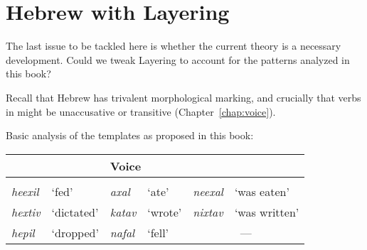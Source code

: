 

\section{Hebrew with Layering} \label{aas:hebrew}
The last issue to be tackled here is whether the current theory is a necessary development. Could we tweak Layering to account for the patterns analyzed in this book?

Recall that Hebrew has trivalent morphological marking, and crucially that verbs in {\tkal} might be unaccusative or transitive (Chapter~\ref{chap:voice}).

\ex\label{ex:aas:alternations-heb2}Basic analysis of the templates as proposed in this book:\\
	\begin{tabular}{ll|ll|ll}
	 \multicolumn{2}{P{4.7cm}|}{\textbf{\vd}}	&	\multicolumn{2}{P{4cm}|}{\textbf{Voice}}	& \multicolumn{2}{P{4cm}}{\textbf{\vz}}\\\hline
	\multicolumn{2}{c|}{\thif}	&	\multicolumn{2}{c|}{\tkal}	& \multicolumn{2}{c}{\tnif}\\
	\emph{heexil}	& `fed' &	\emph{axal}	& `ate'	&	\emph{neexal}	& `was eaten' \\
	\emph{hextiv}	& `dictated' &	\emph{katav}	& `wrote'	&	\emph{nixtav}	& `was written' \\ %
	\emph{hepil} & `dropped' & \emph{nafal}	& `fell' & \multicolumn{2}{c}{---}\\
	\end{tabular}
\xe

